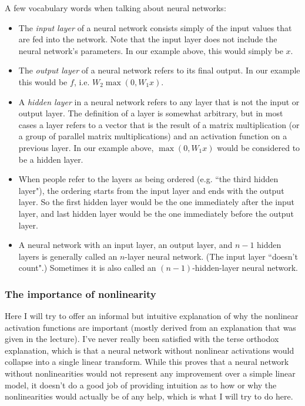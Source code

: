 A few vocabulary words when talking about neural networks:
\begin{itemize}
    \item The \emph{input layer} of a neural network consists simply of the input values that are fed into the network. Note that the input layer does not include the neural network's parameters. In our example above, this would simply be $x$.
    \item The \emph{output layer} of a neural network refers to its final output. In our example this would be $f$, i.e. $W_2\max\left(0, W_1x\right)$.
    \item A \emph{hidden layer} in a neural network refers to any layer that is not the input or output layer. The definition of a layer is somewhat arbitrary, but in most cases a layer refers to a vector that is the result of a matrix multiplication (or a group of parallel matrix multiplications) and an activation function on a previous layer. In our example above, $\max(0, W_1x)$ would be considered to be a hidden layer.
    \item When people refer to the layers as being ordered (e.g. ``the third hidden layer"), the ordering starts from the input layer and ends with the output layer. So the first hidden layer would be the one immediately after the input layer, and last hidden layer would be the one immediately before the output layer.
    \item A neural network with an input layer, an output layer, and $n-1$ hidden layers is generally called an $n$-layer neural network. (The input layer ``doesn't count".) Sometimes it is also called an $(n-1)$-hidden-layer neural network.
\end{itemize}
\subsubsection{The importance of nonlinearity}
Here I will try to offer an informal but intuitive explanation of why the nonlinear activation functions are important (mostly derived from an explanation that was given in the lecture). I've never really been satisfied with the terse orthodox explanation, which is that a neural network without nonlinear activations would collapse into a single linear transform. While this proves that a neural network without nonlinearities would not represent any improvement over a simple linear model, it doesn't do a good job of providing intuition as to how or why the nonlinearities would actually be of any help, which is what I will try to do here.


